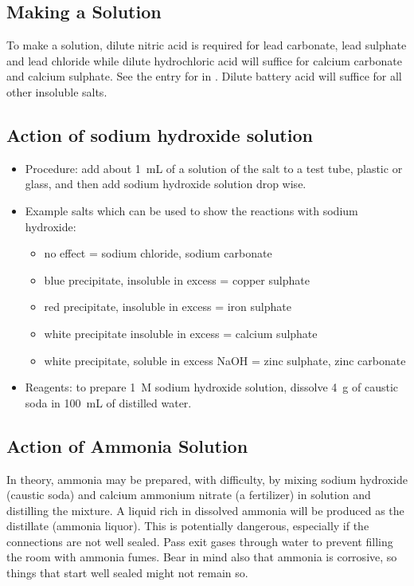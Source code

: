 \subsection{Making a Solution}

To make a solution, 
dilute nitric acid is required for lead carbonate, 
lead sulphate and lead chloride 
while dilute hydrochloric acid will suffice 
for calcium carbonate and calcium sulphate. 
See the entry for  in . 
Dilute battery acid will suffice for all other insoluble salts. 

\subsection{Action of sodium hydroxide solution}
\begin{itemize}
\item{Procedure: add about 1~mL of a solution of the salt to a test tube, 
plastic or glass, 
and then add sodium hydroxide solution drop wise.}
\item{Example salts which can be used to show the reactions with sodium hydroxide:}
\begin{itemize}
\item{no effect = sodium chloride, 
sodium carbonate}
\item{blue precipitate, 
insoluble in excess = copper sulphate}
\item{red precipitate, 
insoluble in excess = iron sulphate}
\item{white precipitate insoluble in excess = calcium sulphate}
\item{white precipitate, 
soluble in excess NaOH = zinc sulphate, 
zinc carbonate}
\end{itemize}
\item{Reagents: to prepare 1~M sodium hydroxide solution, 
dissolve 4~g of caustic soda in 100~mL of distilled water.}
\end{itemize}

\subsection{Action of Ammonia Solution}
In theory, 
ammonia may be prepared, 
with difficulty, 
by mixing sodium hydroxide (caustic soda) 
and calcium ammonium nitrate (a fertilizer) in solution 
and distilling the mixture. 
A liquid rich in dissolved ammonia will be produced 
as the distillate (ammonia liquor). 
This is potentially dangerous, 
especially if the connections are not well sealed. 
Pass exit gases through water to prevent filling the room 
with ammonia fumes. 
Bear in mind also that ammonia is corrosive, 
so things that start well sealed might not remain so. 

